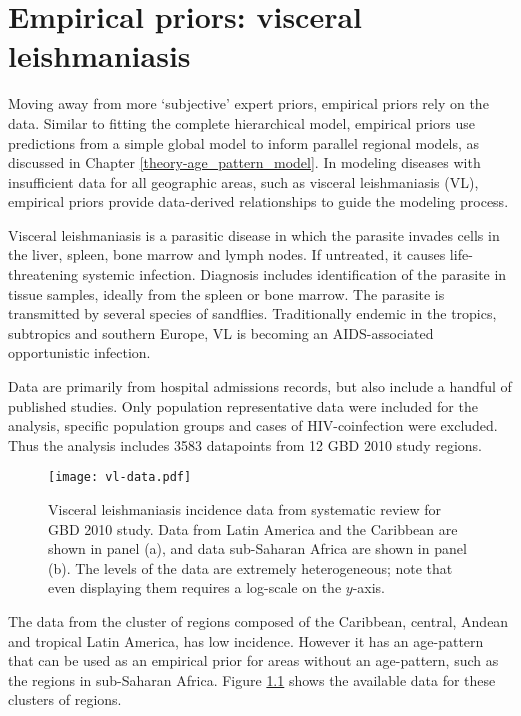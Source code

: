 \chapter{Empirical priors: visceral leishmaniasis}
\label{applications-priors_empirical}

Moving away from more `subjective' expert priors, empirical priors
rely on the data.  Similar to fitting the complete hierarchical model,
empirical priors use predictions from a simple global model to inform
parallel regional models, as discussed in Chapter
\ref{theory-age_pattern_model}.  In modeling diseases with
insufficient data for all geographic areas, such as visceral
leishmaniasis (VL), empirical priors provide data-derived
relationships to guide the modeling process.

Visceral leishmaniasis is a parasitic disease in which the parasite
invades cells in the liver, spleen, bone marrow and lymph nodes.  If
untreated, it causes life-threatening systemic infection.  Diagnosis
includes identification of the parasite in tissue samples, ideally
from the spleen or bone marrow.  The parasite is transmitted by
several species of sandflies.  Traditionally endemic in the tropics,
subtropics and southern Europe, VL is becoming an AIDS-associated
opportunistic infection. \cite{herwaldt_leishmaniasis_1999,
baron_medical_1996}

Data are primarily from hospital admissions records, but also include
a handful of published studies.  Only population
representative data were included for the analysis, specific
population groups and cases of HIV-coinfection were excluded.  Thus
the analysis includes 3583 datapoints from 12 GBD 2010 study regions.

    \begin{figure}[h]
        \begin{center}
            \texttt{[image: vl-data.pdf]}
            \caption{Visceral leishmaniasis incidence data from
              systematic review for GBD 2010 study.  Data from Latin
              America and the Caribbean are shown in panel (a), and
              data sub-Saharan Africa are shown in panel (b).  The
              levels of the data are extremely heterogeneous; note
              that even displaying them requires a log-scale on the
              $y$-axis.}
            \label{fig:app-vl data}
        \end{center}
    \end{figure}

The data from the cluster of regions composed of the Caribbean,
central, Andean and tropical Latin America, has low incidence.
However it has an age-pattern that can be used as an empirical prior
for areas without an age-pattern, such as the regions in sub-Saharan
Africa.  Figure \ref{fig:app-vl data} shows the available data for
these clusters of regions.

